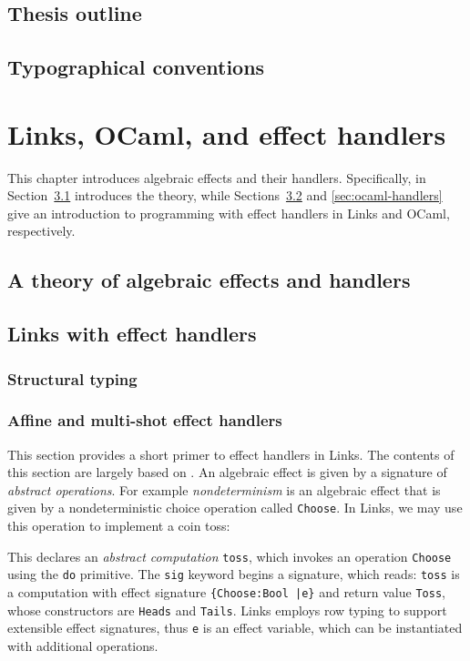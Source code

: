 \documentclass[mscres,cdtppar,twoside,openright,logo,rightchapter,normalheadings]{infthesis}
\theoremstyle{definition}
\begin{document}
\section{Thesis outline}
\section{Typographical conventions}


\chapter{Links, OCaml, and effect handlers}
\label{ch:background}
This chapter introduces algebraic effects and their
handlers. Specifically, in Section~\ref{sec:theory-handlers}
introduces the theory, while Sections~\ref{sec:links-handlers} and
\ref{sec:ocaml-handlers} give an introduction to programming with
effect handlers in Links and OCaml, respectively.

\section{A theory of algebraic effects and handlers}
\label{sec:theory-handlers}

\section{Links with effect handlers}
\label{sec:links-handlers}

\subsection{Structural typing}

\subsection{Affine and multi-shot effect handlers}
\label{sec:links-affine-multi}

This section provides a short primer to effect handlers in Links. The
contents of this section are largely based on
\cite{Hillerstrom2016b}. An algebraic effect is given by a signature
of \emph{abstract operations}. For example \emph{nondeterminism} is an
algebraic effect that is given by a nondeterministic choice operation
called \lstinline$Choose$. In Links, we may use this operation to
implement a coin toss:
%

%
This declares an \emph{abstract computation} \lstinline$toss$, which
invokes an operation \lstinline$Choose$ using the \lstinline$do$
primitive.  The \lstinline$sig$ keyword begins a signature, which
reads: \lstinline$toss$ is a computation with effect signature
\lstinline${Choose:Bool |e}$ and return value \lstinline$Toss$, whose
constructors are \lstinline$Heads$ and \lstinline$Tails$.  Links
employs row typing to support extensible effect signatures, thus
\lstinline$e$ is an effect variable, which can be instantiated with
additional operations.
\end{document}
